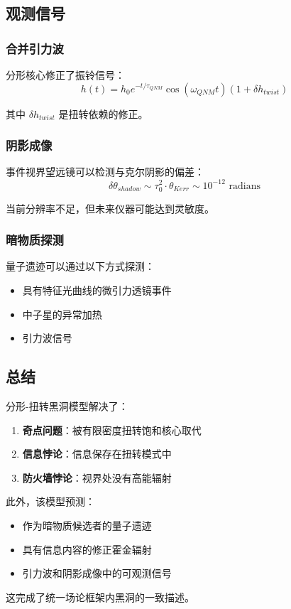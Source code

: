 \subsection{观测信号}

\subsubsection{合并引力波}

分形核心修正了振铃信号：
\begin{equation}
    h(t) = h_0 e^{-t/\tau_{QNM}} \cos(\omega_{QNM}t)(1 + \delta h_{twist})
\end{equation}

其中 $\delta h_{twist}$ 是扭转依赖的修正。

\subsubsection{阴影成像}

事件视界望远镜可以检测与克尔阴影的偏差：
\begin{equation}
    \delta \theta_{shadow} \sim \tau_0^2 \cdot \theta_{Kerr} \sim 10^{-12} \text{ radians}
\end{equation}

当前分辨率不足，但未来仪器可能达到灵敏度。

\subsubsection{暗物质探测}

量子遗迹可以通过以下方式探测：
\begin{itemize}
    \item 具有特征光曲线的微引力透镜事件
    \item 中子星的异常加热
    \item 引力波信号
\end{itemize}

\subsection{总结}

分形-扭转黑洞模型解决了：
\begin{enumerate}
    \item \textbf{奇点问题}：被有限密度扭转饱和核心取代
    \item \textbf{信息悖论}：信息保存在扭转模式中
    \item \textbf{防火墙悖论}：视界处没有高能辐射
\end{enumerate}

此外，该模型预测：
\begin{itemize}
    \item 作为暗物质候选者的量子遗迹
    \item 具有信息内容的修正霍金辐射
    \item 引力波和阴影成像中的可观测信号
\end{itemize}

这完成了统一场论框架内黑洞的一致描述。
